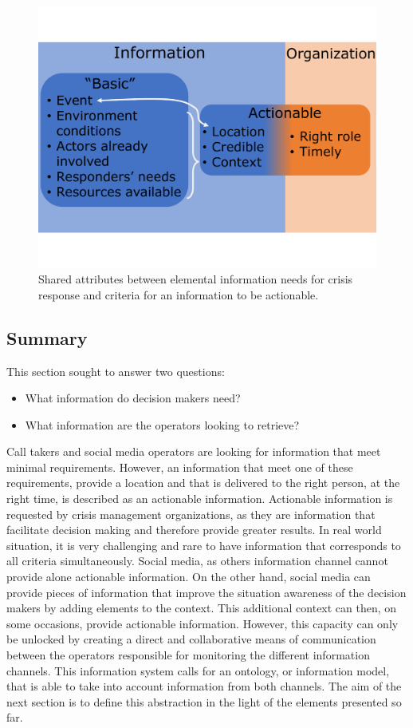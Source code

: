 \begin{figure}
    \centering
    \includegraphics[width=\textwidth]{figures/chap-3/sa-ainf.pdf}
    \caption{Shared attributes between elemental information needs for crisis response and criteria for an information to be actionable.}
    \label{information:sa-inf}
\end{figure}

\subsection*{Summary}
This section sought to answer two questions:

\begin{itemize}
    \item What information do decision makers need?
    \item What information are the operators looking to retrieve?
\end{itemize}

Call takers and social media operators are looking for information that meet minimal requirements.
However, an information that meet one of these requirements, provide a location and that is delivered
to the right person, at the right time, is described as an actionable information.
Actionable information is requested by crisis management organizations, as they are information that
facilitate decision making and therefore provide greater results.
In real world situation, it is very challenging and rare to have information that corresponds to all criteria simultaneously.
Social media, as others information channel cannot provide alone actionable information.
On the other hand, social media can provide pieces of information that improve the situation
awareness of the decision makers by adding elements to the context.
This additional context can then, on some occasions, provide actionable information.
However, this capacity can only be unlocked by creating a direct and collaborative means
of communication between the operators responsible for monitoring the different information channels.
This information system calls for an ontology, or information model, that is able to take
into account information from both channels.
The aim of the next section is to define this abstraction in the light of the elements
presented so far.

